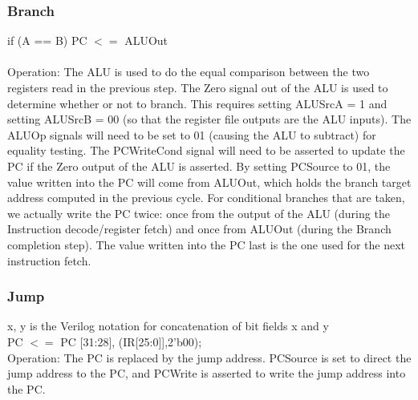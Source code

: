 \documentclass[12pt, a4paper, openany]{book}
\begin{document}
\subsubsection*{Branch}
if (A == B) PC $<=$ ALUOut
\\
\\ Operation: The ALU is used to do the equal comparison between the two registers
read in the previous step. The Zero signal out of the ALU is used to determine whether
or not to branch. This requires setting ALUSrcA = 1 and setting ALUSrcB = 00 (so that
the register file outputs are the ALU inputs). The ALUOp signals will need to be set to
01 (causing the ALU to subtract) for equality testing. The PCWriteCond signal will
need to be asserted to update the PC if the Zero output of the ALU is asserted. By setting
PCSource to 01, the value written into the PC will come from ALUOut, which
holds the branch target address computed in the previous cycle. For conditional
branches that are taken, we actually write the PC twice: once from the output of the
ALU (during the Instruction decode/register fetch) and once from ALUOut (during
the Branch completion step). The value written into the PC last is the one used for the
next instruction fetch.

\subsubsection*{Jump}
{x, y} is the Verilog notation for concatenation of
bit fields x and y
\\ PC $<=$ {PC [31:28], (IR[25:0]],2'b00)};
\\ Operation: The PC is replaced by the jump address. PCSource is set to direct the
jump address to the PC, and PCWrite is asserted to write the jump address into
the PC.
\end{document}
